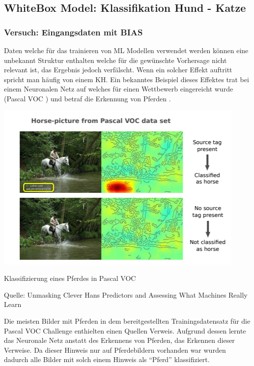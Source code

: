 \documentclass[
  12pt, %
  a4paper, %
  oneside, %
  openany, 
  numbers=noenddot, %
  BCOR=5mm, %
  parskip=half*, %
  thesis, %
]{bfhbook}
\begin{document}
\subsection{WhiteBox Model: Klassifikation Hund - Katze}

\subsubsection*{Versuch: Eingangsdaten mit BIAS}
Daten welche für das trainieren von \Gls{ML} Modellen verwendet werden können eine unbekannt Struktur enthalten welche für die gewünschte Vorhersage nicht relevant ist, das Ergebnis jedoch verfälscht. Wenn ein solcher Effekt auftritt spricht man häufig von einem \Gls{KH}. Ein bekanntes Beispiel dieses Effektes trat bei einem Neuronalen Netz auf welches für einen Wettbewerb eingereicht wurde (Pascal VOC \cite{Everingham_thepascal}) und betraf die Erkennung von Pferden \parencite{Lapuschkin2019}. 

\begin{center}
\begin{minipage}[t]{0.45\linewidth}
\vspace{0pt}
\includegraphics[width=\linewidth]{Bilder/HorsePredictionPascalVOC.PNG}
\caption{Klassifizierung eines Pferdes in Pascal VOC}
\caption*{Quelle: Unmasking Clever Hans Predictors and Assessing What Machines Really Learn \cite{Lapuschkin2019}}
\end{minipage}\hfill
\begin{minipage}[t]{0.45\linewidth}
\vspace{20pt}
Die meisten Bilder mit Pferden in dem bereitgestellten Trainingsdatensatz für die Pascal VOC Challenge enthielten einen Quellen Verweis. Aufgrund dessen lernte das Neuronale Netz anstatt des Erkennens von  Pferden, das Erkennen dieser Verweise. Da dieser Hinweis nur auf Pferdebildern vorhanden war wurden dadurch alle Bilder mit solch einem Hinweis als ``Pferd'' klassifiziert.
\end{minipage}
\end{center}
\end{document}
